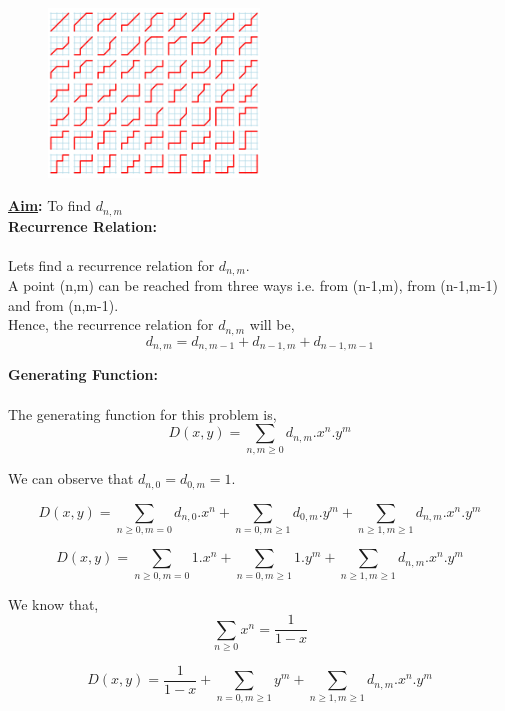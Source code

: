 	\begin{figure}[H]
		\centerline{\includegraphics[width=0.5\textwidth,height=0.5\textwidth]{images/DelannoyNumbers.png}}
	\end{figure}
	
\textbf{\underline{Aim}:} To find $d_{n,m}$ \\ 

\textbf{Recurrence Relation:}\\ \\
Lets find a recurrence relation for $d_{n,m}$.
\\ 
A point (n,m) can be reached from three ways i.e. from (n-1,m), from (n-1,m-1) and from (n,m-1).
\\
Hence, the recurrence relation for $d_{n,m}$ will be,
\begin{equation}
\boxed{d_{n,m} = d_{n,m-1} + d_{n-1,m} + d_{n-1,m-1}}
\end{equation}

\textbf{Generating Function:}\\ \\
The generating function for this problem is,
\begin{equation}
\boxed{D(x,y) = \sum_{n,m \geq 0}d_{n,m}.x^n.y^m}
\end{equation}

We can observe that $d_{n,0}=d_{0,m}=1$.

$$D(x,y) = \sum_{n \geq 0,m=0}d_{n,0}.x^n + \sum_{n=0,m \geq 1}d_{0,m}.y^m + \sum_{n \geq 1,m \geq 1}d_{n,m}.x^n.y^m$$

$$D(x,y) = \sum_{n \geq 0,m=0}1.x^n + \sum_{n=0,m \geq 1}1.y^m + \sum_{n \geq 1,m \geq 1}d_{n,m}.x^n.y^m$$

We know that,
$$\sum_{n \geq 0}x^n = \frac{1}{1-x}$$

$$D(x,y) = \frac{1}{1-x} + \sum_{n=0,m \geq 1}y^m + \sum_{n \geq 1,m \geq 1}d_{n,m}.x^n.y^m$$

